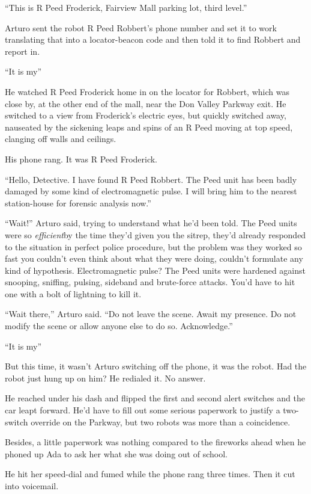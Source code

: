 “This is R Peed Froderick, Fairview Mall parking lot, third
level.”

Arturo sent the robot R Peed Robbert’s phone number and set it to
work translating that into a locator-beacon code and then told it
to find Robbert and report in.

“It is my{\dash}”

He watched R Peed Froderick home in on the locator for Robbert,
which was close by, at the other end of the mall, near the Don
Valley Parkway exit. He switched to a view from Froderick’s
electric eyes, but quickly switched away, nauseated by the
sickening leaps and spins of an R Peed moving at top speed,
clanging off walls and ceilings.

His phone rang. It was R Peed Froderick.

“Hello, Detective. I have found R Peed Robbert. The Peed unit has
been badly damaged by some kind of electromagnetic pulse. I will
bring him to the nearest station-house for forensic analysis now.”

“Wait!” Arturo said, trying to understand what he’d been told. The
Peed units were so \emph{efficient}{\dash}by the time they’d given you
the sitrep, they’d already responded to the situation in perfect
police procedure, but the problem was they worked so fast you
couldn’t even think about what they were doing, couldn’t formulate
any kind of hypothesis. Electromagnetic pulse? The Peed units were
hardened against snooping, sniffing, pulsing, sideband and
brute-force attacks. You’d have to hit one with a bolt of lightning
to kill it.

“Wait there,” Arturo said. “Do not leave the scene. Await my
presence. Do not modify the scene or allow anyone else to do so.
Acknowledge.”

“It is my{\dash}”

But this time, it wasn’t Arturo switching off the phone, it was the
robot. Had the robot just hung up on him? He redialed it. No
answer.

He reached under his dash and flipped the first and second alert
switches and the car leapt forward. He’d have to fill out some
serious paperwork to justify a two-switch override on the Parkway,
but two robots was more than a coincidence.

Besides, a little paperwork was nothing compared to the fireworks
ahead when he phoned up Ada to ask her what she was doing out of
school.

He hit her speed-dial and fumed while the phone rang three times.
Then it cut into voicemail.

